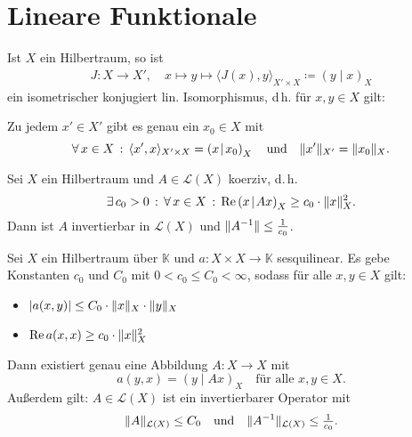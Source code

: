 \documentclass{cheat-sheet}
\newcommand{\K}{\mathbb{K}}
\newcommand{\LSO}{\mathcal{L}} %
\newcommand{\scp}[2]{\left( #1 \!\mid\! #2 \right)} %
\renewcommand{\Re}{\operatorname{Re}} %
\begin{document}
\section{Lineare Funktionale}

\begin{satz}
  Ist $X$ ein Hilbertraum, so ist
  \begin{align*}
    J : X \to X', \quad x \mapsto y \mapsto \langle J(x), y \rangle_{X' {\times} X} \coloneqq \scp{y}{x}_X
  \end{align*}
  ein isometrischer konjugiert lin. Isomorphismus, d\,h. für $x, y \in X$ gilt:
  \begin{itemize}
    \miniitem{0.56 \linewidth}{$\fa{\alpha \in \K} J(\alpha x + y) = \overline{\alpha} Jx + Jy$}
  \end{itemize}
\end{satz}

\begin{umformulierung}
  Zu jedem $x' \in X'$ gibt es genau ein $x_0 \in X$ mit
  \[
    \fa{x \in X} \langle x', x \rangle_{X' {\times} X} = \scp{x}{x_0}_X
    \quad \text{und} \quad
    \norm{x'}_{X'} = \norm{x_0}_{X}.
  \]
\end{umformulierung}

\begin{lem}
  Sei $X$ ein Hilbertraum und $A \in \LSO(X)$ koerziv, d.\,h.
  \[ \ex{c_0 > 0} \fa{x \in X} \Re \scp{x}{Ax}_X \geq c_0 \cdot \norm{x}_X^2. \]
  Dann ist $A$ invertierbar in $\LSO(X)$ und $\lVert A^{-1}\rVert \leq \tfrac{1}{c_0}$.
\end{lem}

\begin{satz}
  Sei $X$ ein Hilbertraum über $\K$ und $a : X \times X \to \K$ sesquilinear. Es gebe Konstanten $c_0$ und $C_0$ mit $0 < c_0 \leq C_0 < \infty$, sodass für alle $x, y \in X$ gilt:
  \begin{itemize}
    \item $\lvert a(x, y)\rvert \leq C_0 \cdot \lVert x\rVert_X \cdot \lVert y\rVert_X$ 
    \item $\Re a(x, x) \geq c_0 \cdot \norm{x}_X^2$ 
  \end{itemize}
  Dann existiert genau eine Abbildung $A : X \to X$ mit
  \[ a(y, x) = \scp{y}{Ax}_X \quad \text{für alle $x, y \in X$.} \]
  Außerdem gilt: $A \in \LSO(X)$ ist ein invertierbarer Operator mit
  \[
    \norm{A}_{\LSO(X)} \leq C_0
    \quad \text{und} \quad
    \norm{A^{-1}}_{\LSO(X)} \leq \tfrac{1}{c_0}.
  \]
\end{satz}
\end{document}
